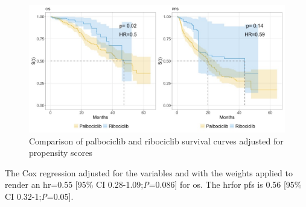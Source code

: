\begin{figure}[ht]
  \centering

  \caption{Comparison of palbociclib and ribociclib survival curves adjusted for propensity scores}\label{fig:propensity} 
  \includegraphics[scale=0.42]{figures/propensity_score_both.jpeg}%

\end{figure}

The Cox regression adjusted for the variables and with the weights applied to render an \ac{hr}=0.55 [95\% CI 0.28-1.09;\textit{P}=0.086] for \ac{os}. The \ac{hr}for \ac{pfs} is 0.56 [95\% CI 0.32-1;\textit{P}=0.05].